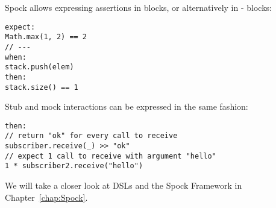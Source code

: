 Spock allows expressing assertions in  blocks,
or alternatively in - blocks:
\autocite{SpockFrameworkDoc}
\begin{verbatim}
expect:
Math.max(1, 2) == 2
// ---
when:
stack.push(elem)
then:
stack.size() == 1
\end{verbatim}
Stub and mock interactions can be expressed in the same fashion:
\autocite{SpockFrameworkDoc}
\begin{verbatim}
then:
// return "ok" for every call to receive
subscriber.receive(_) >> "ok"
// expect 1 call to receive with argument "hello"
1 * subscriber2.receive("hello")
\end{verbatim}
We will take a closer look at DSLs and the Spock Framework in Chapter~\ref{chap:Spock}.

